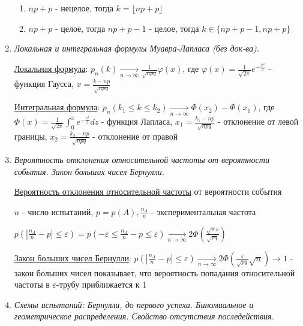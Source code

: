 \begin{enumerate}
\begin{enumerate}
        \item $np + p$ - нецелое, тогда $k = \lfloor np + p \rfloor$

        \item $np + p$ - целое, тогда $np + p - 1$ - целое, тогда $k \in \{np + p - 1, np + p\}$
    \end{enumerate}

    \item \textit{Локальная и интегральная формулы Муавра-Лапласа (без док-ва).}

    \hyperlink{localformulademoivrelaplace}{Локальная формула}: $p_n(k) \underset{n \to \infty}{\longrightarrow} \frac{1}{\sqrt{npq}} \varphi(x)$, где $\varphi(x) = \frac{1}{\sqrt{2\pi}} e^{-\frac{x^2}{2}}$ - функция Гаусса, 
    $x = \frac{k - np}{\sqrt{npq}}$

    \hyperlink{integralformulademoivrelaplace}{Интегральная формула}: $p_n(k_1 \leq k \leq k_2) \underset{n \to \infty}{\longrightarrow} \Phi(x_2) - \Phi(x_1)$, где $\Phi(x) = \frac{1}{\sqrt{2\pi}} \int_0^x e^{-\frac{z^2}{2}} dz$ - функция Лапласа,
    $x_1 = \frac{k_1 - np}{\sqrt{npq}}$ - отклонение от левой границы, $x_2 = \frac{k_2 - np}{\sqrt{npq}}$ - отклонение от правой

    \item \textit{Вероятность отклонения относительной частоты от вероятности события. Закон больших чисел Бернулли.}

    \hyperlink{probabilityofdeviation}{Вероятность отклонения относительной частоты} от вероятности события

    $n$ - число испытаний, $p = p(A), \frac{n_A}{n}$ - экспериментальная частота

    $p\left(|\frac{n_A}{n} - p| \leq \varepsilon\right) = p\left(-\varepsilon \leq \frac{n_A}{n} - p \leq \varepsilon\right) \underset{n \to \infty}{\longrightarrow} 2\Phi\left(\frac{\sqrt{n}\varepsilon}{\sqrt{pq}}\right)$

    \hyperlink{lawofbignumbersbernoulli}{Закон больших чисел Бернулли}: $p\left(|\frac{n_A}{n} - p| \leq \varepsilon\right) \underset{n \to \infty}{\longrightarrow} 2 \Phi\left(\frac{\varepsilon}{\sqrt{pq}}\sqrt{n}\right) \to 1$ - 
    закон больших чисел показывает, что вероятность попадания относительной частоты в $\varepsilon$-трубу приближается к 1

    \item \textit{Схемы испытаний: Бернулли, до первого успеха. Биномиальное и геометрическое распределения. Свойство отсутствия последействия.}


\end{enumerate}
